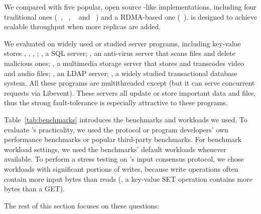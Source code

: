 

We compared \xxx with five popular, open source \paxos-like implementations,
including four traditional ones (\libpaxos~\cite{libpaxos},
\zookeeper~\cite{zookeeper}, \crane~\cite{crane:sosp15} and
\spaxos~\cite{spaxos:srds12}) and a RDMA-based one (\dare~\cite{dare:hpdc15}). 
\spaxos is designed to achieve scalable throughput when more replicas are 
added. 

We evaluated \xxx on \nprog widely used or studied server programs, including
\nkvprog key-value stores \redis, \memcached, \ssdb, \mongodb; \mysql, a SQL
server; \clamav, an anti-virus server that scans files and delete malicious ones;
\mediatomb, a multimedia storage server that stores and transcodes video and
audio files; \openldap, an LDAP server; \calvin, a widely studied transactional
database system. All these programs are multithreaded except \redis (but it can 
serve concurrent requests via Libevent). These servers all update or store 
important data and files, thus the strong \paxos fault-tolerance is especially 
attractive to these programs.

Table~\ref{tab:benchmarks} introduces the benchmarks and workloads we used. To
evaluate \xxx's practicality, we used the protocol or program developers' own 
performance benchmarks or popular third-party benchmarks. For benchmark 
workload settings, we used the benchmarks' default workloads whenever 
available. To perform a stress testing on \xxx's input consensus protocol, we 
chose workloads with significant portions of writes, because write operations 
often contain more input bytes than reads (\eg, a key-value SET operation 
contains more bytes than a GET).



The rest of this section focuses on these questions:

